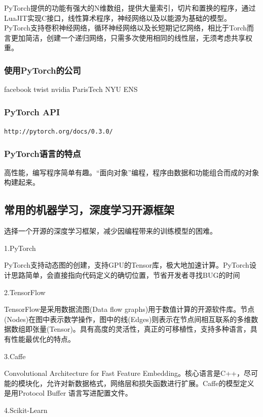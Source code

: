 \documentclass[openbib]{article}
\begin{document}
	PyTorch提供的功能有强大的N维数组，提供大量索引，切片和置换的程序，通过LuaJIT实现C接口，线性算术程序，神经网络以及以能源为基础的模型。
	PyTorch支持卷积神经网络，循环神经网络以及长短期记忆网络，相比于Torch而言更加简洁，创建一个递归网络，只需多次使用相同的线性层，无须考虑共享权重。
	\subsubsection{使用PyTorch的公司}
	facebook twist nvidia ParisTech NYU ENS
	\subsubsection{PyTorch API}
	\texttt{http://pytorch.org/docs/0.3.0/}
	\subsubsection{PyTorch语言的特点}
	高性能，编写程序简单有趣。“面向对象”编程，程序由数据和功能组合而成的对象构建起来。
	\subsection{常用的机器学习，深度学习开源框架}
	选择一个开源的深度学习框架，减少因编程带来的训练模型的困难。
	\begin{center}
		1.PyTorch
	\end{center}

	PyTorch支持动态图的创建，支持GPU的Tensor库，极大地加速计算。PyTorch设计思路简单，会直接指向代码定义的确切位置，节省开发者寻找BUG的时间

	\begin{center}
		2.TensorFlow
	\end{center}

	TensorFlow是采用数据流图(Data flow graphs)用于数值计算的开源软件库。节点(Nodes)在图中表示数学操作，图中的线(Edges)则表示在节点间相互联系的多维数据数组即张量(Tensor)。具有高度的灵活性，真正的可移植性，支持多种语言，具有性能最优化的特点。
	
	\begin{center}
		3.Caffe
	\end{center}

	Convolutional Architecture for Fast Feature Embedding。核心语言是C++，尽可能的模块化，允许对新数据格式，网络层和损失函数进行扩展。Caffe的模型定义是用Protocol Buffer 语言写进配置文件。
	
	\begin{center}
		4.Scikit-Learn
	\end{center}
\end{document}
